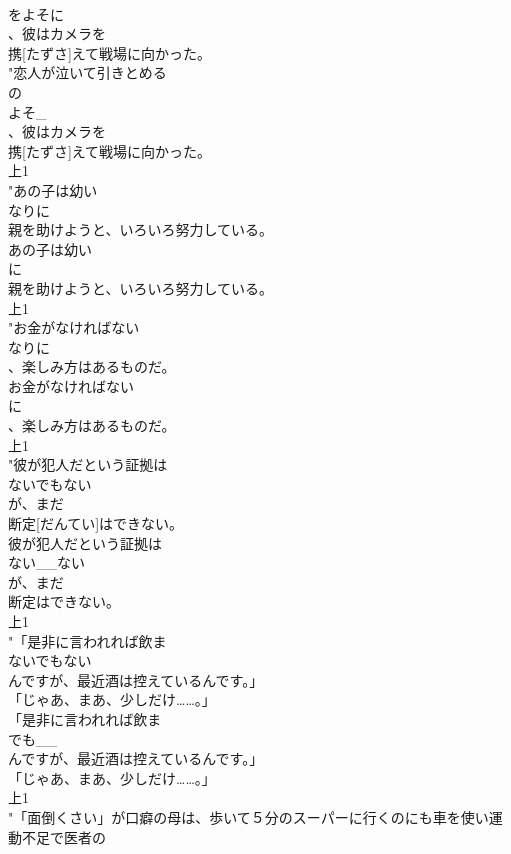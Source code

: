 \documentclass[8pt]{extreport}
\begin{document}
\begin{CJK}{UTF8}{min}
\\	をよそに
\\	、彼はカメラを
\\	携[たずさ]えて戦場に向かった。
\\	"恋人が泣いて引きとめる
\\	の
\\	よそ_
\\	、彼はカメラを
\\	携[たずさ]えて戦場に向かった。
\\	上1
\\	"あの子は幼い
\\	なりに
\\	親を助けようと、いろいろ努力している。
\\	あの子は幼い
\\	に
\\	親を助けようと、いろいろ努力している。
\\	上1
\\	"お金がなければない
\\	なりに
\\	、楽しみ方はあるものだ。
\\	お金がなければない
\\	に
\\	、楽しみ方はあるものだ。
\\	上1
\\	"彼が犯人だという証拠は
\\	ないでもない
\\	が、まだ
\\	断定[だんてい]はできない。
\\	彼が犯人だという証拠は
\\	ない__ない
\\	が、まだ
\\	断定はできない。
\\	上1
\\	"「是非に言われれば飲ま
\\	ないでもない
\\	んですが、最近酒は控えているんです。」
\\	「じゃあ、まあ、少しだけ……。」
\\	「是非に言われれば飲ま
\\	でも__
\\	んですが、最近酒は控えているんです。」
\\	「じゃあ、まあ、少しだけ……。」
\\	上1
\\	"「面倒くさい」が口癖の母は、歩いて５分のスーパーに行くのにも車を使い運動不足で医者の

\end{CJK}
\end{document}
